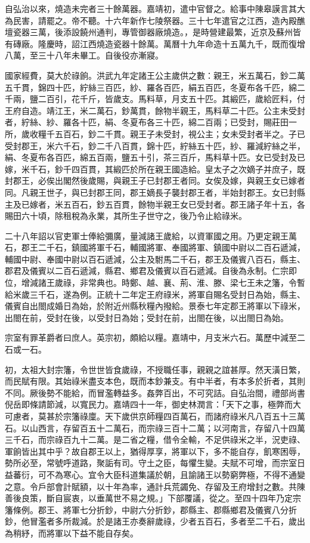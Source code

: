 自弘治以來，燒造未完者三十餘萬器。嘉靖初，遣中官督之。給事中陳皋謨言其大為民害，請罷之。帝不聽。十六年新作七陵祭器。三十七年遣官之江西，造內殿醮壇瓷器三萬，後添設饒州通判，專管御器廠燒造。，是時營建最繁，近京及蘇州皆有磚廠。隆慶時，詔江西燒造瓷器十餘萬。萬曆十九年命造十五萬九千，既而復增八萬，至三十八年未畢工。自後役亦漸寢。

國家經費，莫大於祿餉。洪武九年定諸王公主歲供之數：親王，米五萬石，鈔二萬五千貫，錦四十匹，紵絲三百匹，紗、羅各百匹，絹五百匹，冬夏布各千匹，綿二千兩，鹽二百引，花千斤，皆歲支。馬料草，月支五十匹。其緞匹，歲給匠料，付王府自造。靖江王，米二萬石，鈔萬貫，餘物半親王，馬料草二十匹。公主未受封者，紵絲、紗、羅各十匹，絹、冬夏布各三十匹，綿二百兩；已受封，賜莊田一所，歲收糧千五百石，鈔二千貫。親王子未受封，視公主；女未受封者半之。子已受封郡王，米六千石，鈔二千八百貫，錦十匹，紵絲五十匹，紗、羅減紵絲之半，絹、冬夏布各百匹，綿五百兩，鹽五十引，茶三百斤，馬料草十匹。女已受封及已嫁，米千石，鈔千四百貫，其緞匹於所在親王國造給。皇太子之次嫡子并庶子，既封郡王，必俟出閣然後歲賜，與親王子已封郡王者同。女俟及嫁，與親王女已嫁者同。凡親王世子，與已封郡王同，郡王嫡長子襲封郡王者，半始封郡王。女已封縣主及已嫁者，米五百石，鈔五百貫，餘物半親王女已受封者。郡王諸子年十五，各賜田六十頃，除租稅為永業，其所生子世守之，後乃令止給祿米。

二十八年詔以官吏軍士俸給彌廣，量減諸王歲給，以資軍國之用。乃更定親王萬石，郡王二千石，鎮國將軍千石，輔國將軍、奉國將軍、鎮國中尉以二百石遞減，輔國中尉、奉國中尉以百石遞減，公主及駙馬二千石，郡王及儀賓八百石，縣主、郡君及儀賓以二百石遞減，縣君、鄉君及儀賓以百石遞減。自後為永制。仁宗即位，增減諸王歲祿，非常典也。時鄭、越、襄、荊、淮、滕、梁七王未之籓，令暫給米歲三千石，遂為例。正統十二年定王府祿米，將軍自賜名受封日為始，縣主、儀賓自出閤成婚日為始，於附近州縣秋糧內撥給。景泰七年定郡王將軍以下祿米，出閤在前，受封在後，以受封日為始；受封在前，出閤在後，以出閤日為始。

宗室有罪革爵者曰庶人。英宗初，頗給以糧。嘉靖中，月支米六石。萬歷中減至二石或一石。

初，太祖大封宗籓，令世世皆食歲祿，不授職任事，親親之誼甚厚。然天潢日繁，而民賦有限。其始祿米盡支本色，既而本鈔兼支。有中半者，有本多於折者，其則不同。厥後勢不能給，而冒濫轉益多。姦弊百出，不可究詰。自弘治間，禮部尚書倪岳即條請節減，以寬民力。嘉靖四十一年，御史林潤言：「天下之事，極弊而大可慮者，莫甚於宗籓祿廩。天下歲供京師糧四百萬石，而諸府祿米凡八百五十三萬石。以山西言，存留百五十二萬石，而宗祿三百十二萬；以河南言，存留八十四萬三千石，而宗祿百九十二萬。是二省之糧，借令全輸，不足供祿米之半，況吏祿、軍餉皆出其中乎？故自郡王以上，猶得厚享，將軍以下，多不能自存，飢寒困辱，勢所必至，常號呼道路，聚詬有司。守土之臣，每懼生變。夫賦不可增，而宗室日益蕃衍，可不為寒心。宜令大臣科道集議於朝，且諭諸王以勢窮弊極，不得不通變之意。令戶部會計賦額，以十年為率，通計兵荒蠲免、存留及王府增封之數。共陳善後良策，斷自宸衷，以垂萬世不易之規。」下部覆議，從之。至四十四年乃定宗籓條例。郡王、將軍七分折鈔，中尉六分折鈔，郡縣主、郡縣鄉君及儀賓八分折鈔，他冒濫者多所裁減。於是諸王亦奏辭歲祿，少者五百石，多者至二千石，歲出為稍紓，而將軍以下益不能自存矣。

